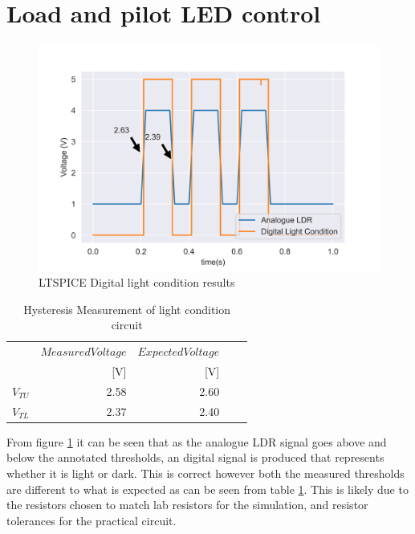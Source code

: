  \section{Load and pilot LED control}
 
 
 \begin{figure}[!htb]
 	\centering
 	\includegraphics[scale=0.48]{./Figures/A7/A72digitallight.png}
 	\caption{LTSPICE Digital light condition results}
 	\label{fig:A7digital}
 \end{figure}
 
 
 \begin{table}[!htb]
 	\centering
 	\footnotesize
 	\caption{Hysteresis Measurement of light condition circuit}
 	\begin{tabular}{lrrrr}
 		\toprule
 		& $Measured Voltage$&$Expected Voltage$ \\
 		&  [V]&[V] \\
 		\midrule
 		$V_{TU}$      &2.58&2.60  \\
 		$V_{TL}$     & 2.37&2.40\\
 		
 		\bottomrule
 	\end{tabular}
 	\label{tab:hyst meas_light}
 \end{table}




From figure \ref{fig:A7digital} it can be seen that as the analogue LDR signal goes above and below the annotated thresholds, an digital signal is produced that represents whether it is light or dark. This is correct however both the measured thresholds are different to what is expected as can be seen from table \ref{tab:hyst meas_light}. This is likely due to the resistors chosen to match lab resistors for the simulation, and resistor tolerances for the practical circuit.



